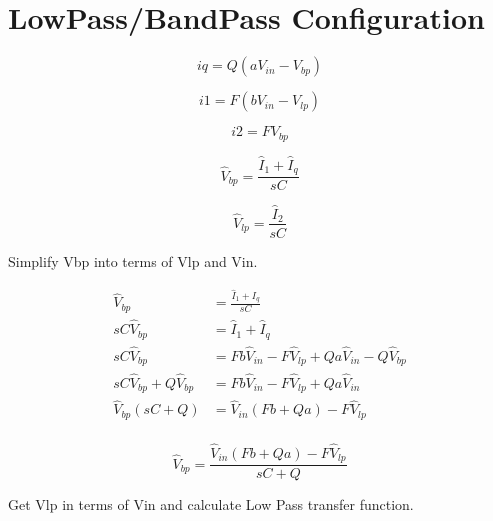 \documentclass{article}
\begin{document}
\section{LowPass/BandPass Configuration}

\begin{equation}
  iq = Q(aV_{in} - V_{bp})
\end{equation}

\begin{equation}
  i1 = F(bV_{in} - V_{lp})
\end{equation}

\begin{equation}
  i2 = FV_{bp}
\end{equation}

\begin{equation}
  \hat{V}_{bp} = \frac{\hat{I}_1 + \hat{I}_q}{sC}
\end{equation}

\begin{equation}
  \hat{V}_{lp} = \frac{\hat{I}_2}{sC}
\end{equation}

Simplify Vbp into terms of Vlp and Vin.

\begin{equation*}
\begin{split}
  \hat{V}_{bp} & = \frac{\hat{I}_1 + \hat{I}_q}{sC} \\
  sC\hat{V}_{bp} & = \hat{I}_1 + \hat{I}_q \\
  sC\hat{V}_{bp} & = Fb\hat{V}_{in} - F\hat{V}_{lp} + Qa\hat{V}_{in} - Q\hat{V}_{bp} \\
  sC\hat{V}_{bp} + Q\hat{V}_{bp} & = Fb\hat{V}_{in} - F\hat{V}_{lp} + Qa\hat{V}_{in}\\
  \hat{V}_{bp}(sC + Q) & = \hat{V}_{in}(Fb + Qa) - F\hat{V}_{lp} \\
\end{split}
\end{equation*}

\begin{equation}
  \hat{V}_{bp} = \frac{\hat{V}_{in}(Fb + Qa) - F\hat{V}_{lp}}{sC + Q}
\end{equation}

Get Vlp in terms of Vin and calculate Low Pass transfer function.
\end{document}
